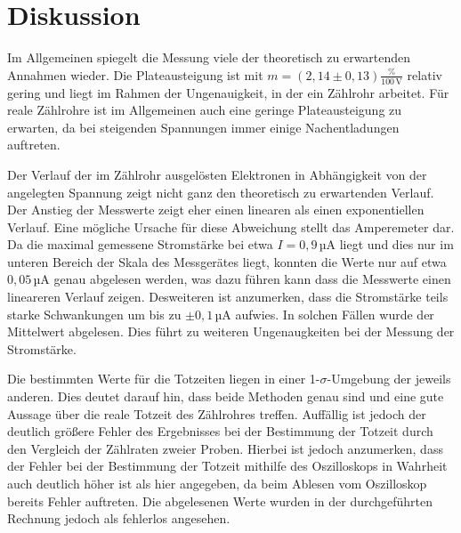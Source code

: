 \newpage
\section{Diskussion}
\label{sec:Diskussion}

Im Allgemeinen spiegelt die Messung viele der theoretisch zu erwartenden Annahmen
wieder. Die Plateausteigung ist mit $m=(2{,}14 \pm 0{,}13)\frac{\%}{100\, \text{V}}$
relativ gering und liegt im Rahmen der Ungenauigkeit, in der ein Zählrohr arbeitet.
Für reale Zählrohre ist im Allgemeinen auch eine geringe Plateausteigung zu erwarten,
da bei steigenden Spannungen immer einige Nachentladungen auftreten.

Der Verlauf der im Zählrohr ausgelösten Elektronen in Abhängigkeit von der angelegten
Spannung zeigt nicht ganz den theoretisch zu erwartenden Verlauf. Der Anstieg
der Messwerte zeigt eher einen linearen als einen exponentiellen Verlauf. Eine
mögliche Ursache für diese Abweichung stellt das Amperemeter dar. Da die maximal
gemessene Stromstärke bei etwa $I=0{,}9\,$µA liegt und dies nur im unteren Bereich
der Skala des Messgerätes liegt, konnten die Werte nur auf etwa $0{,}05\,$µA genau
abgelesen werden, was dazu führen kann dass die Messwerte einen lineareren Verlauf
zeigen. Desweiteren ist anzumerken, dass die Stromstärke teils starke Schwankungen
um bis zu $\pm 0{,}1\,$µA aufwies. In solchen Fällen wurde der Mittelwert abgelesen.
Dies führt zu weiteren Ungenaugkeiten bei der Messung der Stromstärke.

Die bestimmten Werte für die  Totzeiten liegen in einer 1-$\sigma$-Umgebung der jeweils
anderen. Dies deutet darauf hin, dass beide Methoden genau sind und
eine gute Aussage über die reale Totzeit des Zählrohres treffen. Auffällig
ist jedoch der deutlich größere Fehler des Ergebnisses bei der Bestimmung der Totzeit
durch den Vergleich der Zählraten zweier Proben. Hierbei ist jedoch anzumerken,
dass der Fehler bei der Bestimmung der Totzeit mithilfe des Oszilloskops in Wahrheit
auch deutlich höher ist als hier angegeben, da beim Ablesen vom Oszilloskop bereits
Fehler auftreten. Die abgelesenen Werte wurden in der durchgeführten Rechnung jedoch als
fehlerlos angesehen.
